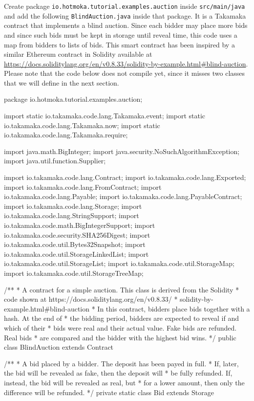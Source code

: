 Create package \texttt{io.hotmoka.tutorial.examples.auction}
inside \texttt{src/main/java} and add
the following \texttt{BlindAuction.java} inside that package.
It is a Takamaka contract that implements
a blind auction. Since each bidder may place more bids and since such bids
must be kept in storage until reveal time, this code uses a map
from bidders to lists of bids. This smart contract has been inspired
by a similar Ethereum contract in Solidity available at
\url{https://docs.soliditylang.org/en/v0.8.33/solidity-by-example.html#blind-auction}.
Please note that the code below does not compile yet, since it misses two classes
that we will define in the next section.

%
\begin{codebox}\begin{javalst}
package io.hotmoka.tutorial.examples.auction;

import static io.takamaka.code.lang.Takamaka.event;
import static io.takamaka.code.lang.Takamaka.now;
import static io.takamaka.code.lang.Takamaka.require;

import java.math.BigInteger;
import java.security.NoSuchAlgorithmException;
import java.util.function.Supplier;

import io.takamaka.code.lang.Contract;
import io.takamaka.code.lang.Exported;
import io.takamaka.code.lang.FromContract;
import io.takamaka.code.lang.Payable;
import io.takamaka.code.lang.PayableContract;
import io.takamaka.code.lang.Storage;
import io.takamaka.code.lang.StringSupport;
import io.takamaka.code.math.BigIntegerSupport;
import io.takamaka.code.security.SHA256Digest;
import io.takamaka.code.util.Bytes32Snapshot;
import io.takamaka.code.util.StorageLinkedList;
import io.takamaka.code.util.StorageList;
import io.takamaka.code.util.StorageMap;
import io.takamaka.code.util.StorageTreeMap;

/**
* A contract for a simple auction. This class is derived from the Solidity
* code shown at https://docs.soliditylang.org/en/v0.8.33/
* solidity-by-example.html#blind-auction
* In this contract, bidders place bids together with a hash. At the end of
* the bidding period, bidders are expected to reveal if and which of their
* bids were real and their actual value. Fake bids are refunded. Real bids
* are compared and the bidder with the highest bid wins.
*/
public class BlindAuction extends Contract {

  /**
  * A bid placed by a bidder. The deposit has been payed in full.
  * If, later, the bid will be revealed as fake, then the deposit will
  * be fully refunded. If, instead, the bid will be revealed as real, but
  * for a lower amount, then only the difference will be refunded.
  */
  private static class Bid extends Storage {

}}
\end{javalst}
\end{codebox}
